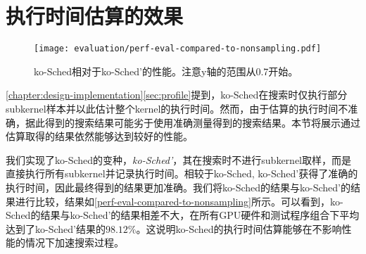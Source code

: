 \section{执行时间估算的效果}\label{exp-est}

\begin{figure}[htbp]
    \centering
    \texttt{[image: evaluation/perf-eval-compared-to-nonsampling.pdf]}
    \caption{ko-Sched相对于ko-Sched'的性能。注意y轴的范围从0.7开始。}
    \label{perf-eval-compared-to-nonsampling}
\end{figure}

\autoref{chapter:design-implementation}\autoref{sec:profile}提到，ko-Sched在搜索时仅执行部分subkernel样本并以此估计整个kernel的执行时间。然而，由于估算的执行时间不准确，据此得到的搜索结果可能劣于使用准确测量得到的搜索结果。本节将展示通过估算取得的结果依然能够达到较好的性能。

我们实现了ko-Sched的变种，\emph{ko-Sched'}，其在搜索时不进行subkernel取样，而是直接执行所有subkernel并记录执行时间。相较于ko-Sched, ko-Sched'获得了准确的执行时间，因此最终得到的结果更加准确。我们将ko-Sched的结果与ko-Sched'的结果进行比较，结果如\autoref{perf-eval-compared-to-nonsampling}所示。可以看到，ko-Sched的结果与ko-Sched'的结果相差不大，在所有GPU硬件和测试程序组合下平均达到了ko-Sched'结果的$98.12\%$。这说明ko-Sched的执行时间估算能够在不影响性能的情况下加速搜索过程。
